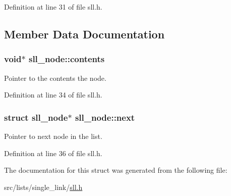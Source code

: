 Definition at line 31 of file sll.h.



\subsection{Member Data Documentation}
\hypertarget{structsll__node_aafacbed96ba149b0b8c705426196154c}{
\subsubsection[{contents}]{\setlength{\rightskip}{0pt plus 5cm}void$\ast$ {\bf sll\_\-node::contents}}}
\label{structsll__node_aafacbed96ba149b0b8c705426196154c}


Pointer to the contents the node. 



Definition at line 34 of file sll.h.

\hypertarget{structsll__node_aa2e4c5d743ad44e759b5ca13f9915826}{
\subsubsection[{next}]{\setlength{\rightskip}{0pt plus 5cm}struct {\bf sll\_\-node}$\ast$ {\bf sll\_\-node::next}}}
\label{structsll__node_aa2e4c5d743ad44e759b5ca13f9915826}


Pointer to next node in the list. 



Definition at line 36 of file sll.h.



The documentation for this struct was generated from the following file:\begin{DoxyCompactItemize}
\item 
src/lists/single\_\-link/\hyperlink{sll_8h}{sll.h}\end{DoxyCompactItemize}
